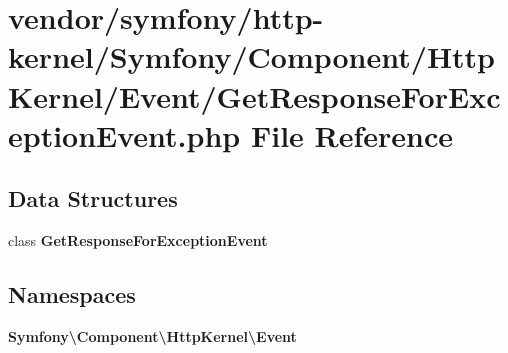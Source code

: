 \section{vendor/symfony/http-\/kernel/\+Symfony/\+Component/\+Http\+Kernel/\+Event/\+Get\+Response\+For\+Exception\+Event.php File Reference}
\label{_get_response_for_exception_event_8php}
\subsection*{Data Structures}
\begin{DoxyCompactItemize}
\item 
class {\bf Get\+Response\+For\+Exception\+Event}
\end{DoxyCompactItemize}
\subsection*{Namespaces}
\begin{DoxyCompactItemize}
\item 
 {\bf Symfony\textbackslash{}\+Component\textbackslash{}\+Http\+Kernel\textbackslash{}\+Event}
\end{DoxyCompactItemize}
